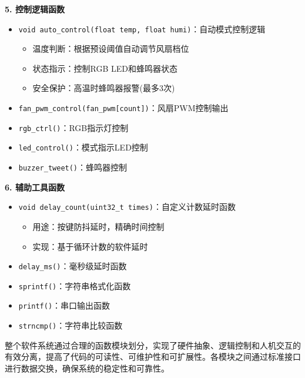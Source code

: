 \textbf{5. 控制逻辑函数}
\begin{itemize}
    \vspace{-6pt}
  \item \texttt{void auto\_control(float temp, float humi)}：自动模式控制逻辑
    \begin{itemize}
        \vspace{-3pt}
      \item 温度判断：根据预设阈值自动调节风扇档位
        \vspace{-3pt}
      \item 状态指示：控制RGB LED和蜂鸣器状态
        \vspace{-3pt}
      \item 安全保护：高温时蜂鸣器报警(最多3次)
    \end{itemize}
    \vspace{-6pt}
  \item \texttt{fan\_pwm\_control(fan\_pwm[count])}：风扇PWM控制输出
    \vspace{-6pt}
  \item \texttt{rgb\_ctrl()}：RGB指示灯控制
    \vspace{-6pt}
  \item \texttt{led\_control()}：模式指示LED控制
    \vspace{-6pt}
  \item \texttt{buzzer\_tweet()}：蜂鸣器控制
\end{itemize}

\textbf{6. 辅助工具函数}
\begin{itemize}
    \vspace{-6pt}
  \item \texttt{void delay\_count(uint32\_t times)}：自定义计数延时函数
    \begin{itemize}
        \vspace{-3pt}
      \item 用途：按键防抖延时，精确时间控制
        \vspace{-3pt}
      \item 实现：基于循环计数的软件延时
    \end{itemize}
    \vspace{-6pt}
  \item \texttt{delay\_ms()}：毫秒级延时函数
    \vspace{-6pt}
  \item \texttt{sprintf()}：字符串格式化函数
    \vspace{-6pt}
  \item \texttt{printf()}：串口输出函数
    \vspace{-6pt}
  \item \texttt{strncmp()}：字符串比较函数
\end{itemize}

\qquad 整个软件系统通过合理的函数模块划分，实现了硬件抽象、逻辑控制和人机交互的有效分离，提高了代码的可读性、可维护性和可扩展性。各模块之间通过标准接口进行数据交换，确保系统的稳定性和可靠性。